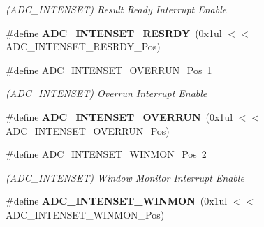 \begin{DoxyCompactItemize}
\begin{DoxyCompactList}\small\item\em (A\+D\+C\+\_\+\+I\+N\+T\+E\+N\+S\+E\+T) Result Ready Interrupt Enable \end{DoxyCompactList}\item 
\hypertarget{group___s_a_m_l21___a_d_c_ga9f32702bf0d530557a39ca292e51d1e4}{}\#define {\bfseries A\+D\+C\+\_\+\+I\+N\+T\+E\+N\+S\+E\+T\+\_\+\+R\+E\+S\+R\+D\+Y}~(0x1ul $<$$<$ A\+D\+C\+\_\+\+I\+N\+T\+E\+N\+S\+E\+T\+\_\+\+R\+E\+S\+R\+D\+Y\+\_\+\+Pos)\label{group___s_a_m_l21___a_d_c_ga9f32702bf0d530557a39ca292e51d1e4}

\item 
\hypertarget{group___s_a_m_l21___a_d_c_ga7d9b2895c1dcd0cd79242a303f9892ec}{}\#define \hyperlink{group___s_a_m_l21___a_d_c_ga7d9b2895c1dcd0cd79242a303f9892ec}{A\+D\+C\+\_\+\+I\+N\+T\+E\+N\+S\+E\+T\+\_\+\+O\+V\+E\+R\+R\+U\+N\+\_\+\+Pos}~1\label{group___s_a_m_l21___a_d_c_ga7d9b2895c1dcd0cd79242a303f9892ec}

\begin{DoxyCompactList}\small\item\em (A\+D\+C\+\_\+\+I\+N\+T\+E\+N\+S\+E\+T) Overrun Interrupt Enable \end{DoxyCompactList}\item 
\hypertarget{group___s_a_m_l21___a_d_c_ga00624ba4fc56a2fd9f608ea2c0540e9f}{}\#define {\bfseries A\+D\+C\+\_\+\+I\+N\+T\+E\+N\+S\+E\+T\+\_\+\+O\+V\+E\+R\+R\+U\+N}~(0x1ul $<$$<$ A\+D\+C\+\_\+\+I\+N\+T\+E\+N\+S\+E\+T\+\_\+\+O\+V\+E\+R\+R\+U\+N\+\_\+\+Pos)\label{group___s_a_m_l21___a_d_c_ga00624ba4fc56a2fd9f608ea2c0540e9f}

\item 
\hypertarget{group___s_a_m_l21___a_d_c_ga83db55040702e080d753687d992794af}{}\#define \hyperlink{group___s_a_m_l21___a_d_c_ga83db55040702e080d753687d992794af}{A\+D\+C\+\_\+\+I\+N\+T\+E\+N\+S\+E\+T\+\_\+\+W\+I\+N\+M\+O\+N\+\_\+\+Pos}~2\label{group___s_a_m_l21___a_d_c_ga83db55040702e080d753687d992794af}

\begin{DoxyCompactList}\small\item\em (A\+D\+C\+\_\+\+I\+N\+T\+E\+N\+S\+E\+T) Window Monitor Interrupt Enable \end{DoxyCompactList}\item 
\hypertarget{group___s_a_m_l21___a_d_c_ga9663d267bff1c4a71847d99528f1a424}{}\#define {\bfseries A\+D\+C\+\_\+\+I\+N\+T\+E\+N\+S\+E\+T\+\_\+\+W\+I\+N\+M\+O\+N}~(0x1ul $<$$<$ A\+D\+C\+\_\+\+I\+N\+T\+E\+N\+S\+E\+T\+\_\+\+W\+I\+N\+M\+O\+N\+\_\+\+Pos)\label{group___s_a_m_l21___a_d_c_ga9663d267bff1c4a71847d99528f1a424}


\end{DoxyCompactItemize}
